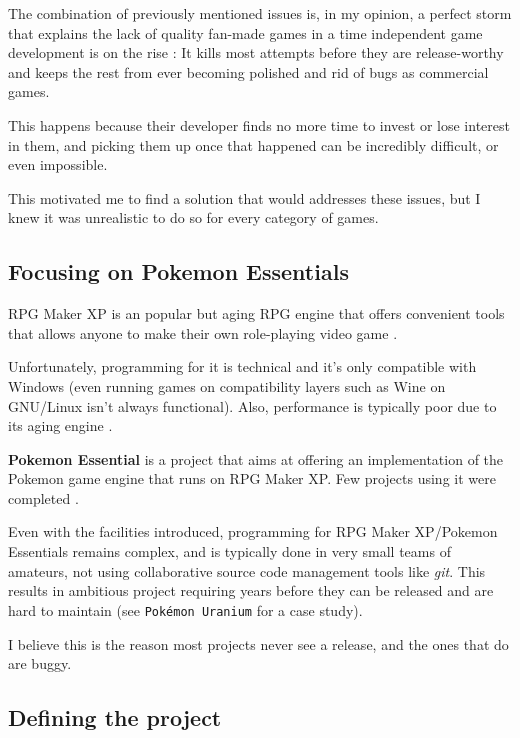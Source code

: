 \documentclass[11pt]{article}
\begin{document}
The combination of previously mentioned issues is, in my opinion, a perfect storm that explains the lack of quality fan-made games in a time independent game development is on the rise : It kills most attempts before they are release-worthy and keeps the rest from ever becoming polished and rid of bugs as commercial games. 

This happens because their developer finds no more time to invest or lose interest in them, and picking them up once that happened can be incredibly difficult, or even impossible.

This motivated me to find a solution that would addresses these issues, but I knew it was unrealistic to do so for every category of games.


\subsection{Focusing on Pokemon Essentials}

RPG Maker XP is an popular but aging RPG engine that offers convenient tools that allows anyone to make their own role-playing video game \cite{RMXP}.

Unfortunately, programming for it is technical and it's only compatible with Windows (even running games on compatibility layers such as Wine on GNU/Linux isn't always functional). Also, performance is typically poor due to its aging engine \cite{PoorPerf}.

\textbf{Pokemon Essential} is a project that aims at offering an implementation of the Pokemon game engine that runs on RPG Maker XP. Few projects using it were completed \cite{PkmnFangames}.

Even with the facilities introduced, programming for RPG Maker XP/Pokemon Essentials remains complex, and is typically done in very small teams of amateurs, not using collaborative source code management tools like \textit{git}. This results in ambitious project requiring years before they can be released and are hard to maintain (see \texttt{Pokémon Uranium} for a case study).

I believe this is the reason most projects never see a release, and the ones that do are buggy.


\subsection{Defining the project}

\end{document}
